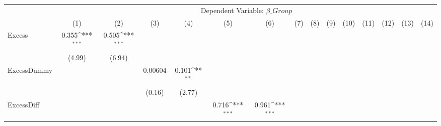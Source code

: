 {
\def\sym#1{\ifmmode^{#1}\else\(^{#1}\)\fi}
\begin{tabular}{l*{14}{c}}
\hline\hline
                &\multicolumn{14}{c}{Dependent Variable: $ \beta\_{Group} $ }                                                                                                                                                                                                              \\\cmidrule(lr){2-15}
                &\multicolumn{1}{c}{(1)}         &\multicolumn{1}{c}{(2)}         &\multicolumn{1}{c}{(3)}         &\multicolumn{1}{c}{(4)}         &\multicolumn{1}{c}{(5)}         &\multicolumn{1}{c}{(6)}         &\multicolumn{1}{c}{(7)}         &\multicolumn{1}{c}{(8)}         &\multicolumn{1}{c}{(9)}         &\multicolumn{1}{c}{(10)}         &\multicolumn{1}{c}{(11)}         &\multicolumn{1}{c}{(12)}         &\multicolumn{1}{c}{(13)}         &\multicolumn{1}{c}{(14)}         \\
\hline
Excess          &    0.355\sym{***}&    0.505\sym{***}&                  &                  &                  &                  &                  &                  &                  &                  &                  &                  &                  &                  \\
                &   (4.99)         &   (6.94)         &                  &                  &                  &                  &                  &                  &                  &                  &                  &                  &                  &                  \\
[1em]
ExcessDummy     &                  &                  &  0.00604         &    0.101\sym{**} &                  &                  &                  &                  &                  &                  &                  &                  &                  &                  \\
                &                  &                  &   (0.16)         &   (2.77)         &                  &                  &                  &                  &                  &                  &                  &                  &                  &                  \\
[1em]
ExcessDiff      &                  &                  &                  &                  &    0.716\sym{***}&    0.961\sym{***}&                  &                  &                  &                  &                  &                  &                  &                  \\

\end{tabular}}
